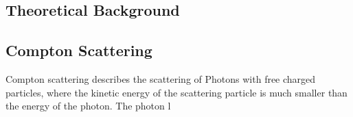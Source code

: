 \subsection{Theoretical Background}

\subsection{Compton Scattering}

Compton scattering describes the scattering of Photons with free charged particles, where the kinetic energy of the scattering particle is much smaller than the energy of the photon.
The photon l


